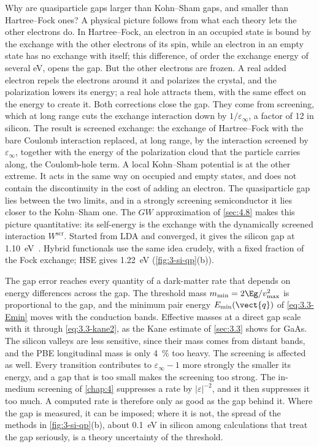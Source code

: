 Why are quasiparticle gaps larger than Kohn--Sham gaps, and smaller than Hartree--Fock ones? A physical picture follows from what each theory lets the other electrons do. In Hartree--Fock, an electron in an occupied state is bound by the exchange with the other electrons of its spin, while an electron in an empty state has no exchange with itself; this difference, of order the exchange energy of several eV, opens the gap. But the other electrons are frozen. A real added electron repels the electrons around it and polarizes the crystal, and the polarization lowers its energy; a real hole attracts them, with the same effect on the energy to create it. Both corrections close the gap. They come from screening, which at long range cuts the exchange interaction down by $1/\varepsilon_\infty$, a factor of 12 in silicon. The result is screened exchange: the exchange of Hartree--Fock with the bare Coulomb interaction replaced, at long range, by the interaction screened by $\varepsilon_\infty$, together with the energy of the polarization cloud that the particle carries along, the Coulomb-hole term. A local Kohn--Sham potential is at the other extreme. It acts in the same way on occupied and empty states, and does not contain the discontinuity in the cost of adding an electron. The quasiparticle gap lies between the two limits, and in a strongly screening semiconductor it lies closer to the Kohn--Sham one. The $GW$ approximation of \cref{sec:4.8} makes this picture quantitative: its self-energy is the exchange with the dynamically screened interaction $W^{\mathrm{scr}}$. Started from LDA and converged, it gives the silicon gap at \SI{1.10}{eV}~\cite[Sect.~IV\,C]{klimes2014predictive}. Hybrid functionals use the same idea crudely, with a fixed fraction of the Fock exchange; HSE gives \SI{1.22}{eV} (\cref{fig:3-si-qp}(b)).

The gap error reaches every quantity of a dark-matter rate that depends on energy differences across the gap. The threshold mass $m_{\mathrm{min}} = 2\Eg/v_{\mathrm{max}}^2$ is proportional to the gap, and the minimum pair energy $E_{\mathrm{min}}(\vect{q})$ of \cref{eq:3.3-Emin} moves with the conduction bands. Effective masses at a direct gap scale with it through \cref{eq:3.3-kane2}, as the Kane estimate of \cref{sec:3.3} shows for GaAs. The silicon valleys are less sensitive, since their mass comes from distant bands, and the PBE longitudinal mass is only \SI{4}{\percent} too heavy. The screening is affected as well. Every transition contributes to $\varepsilon_\infty - 1$ more strongly the smaller its energy, and a gap that is too small makes the screening too strong. The in-medium screening of \cref{chap:4} suppresses a rate by $|\varepsilon|^{-2}$, and it then suppresses it too much. A computed rate is therefore only as good as the gap behind it. Where the gap is measured, it can be imposed; where it is not, the spread of the methods in \cref{fig:3-si-qp}(b), about \SI{0.1}{eV} in silicon among calculations that treat the gap seriously, is a theory uncertainty of the threshold.

